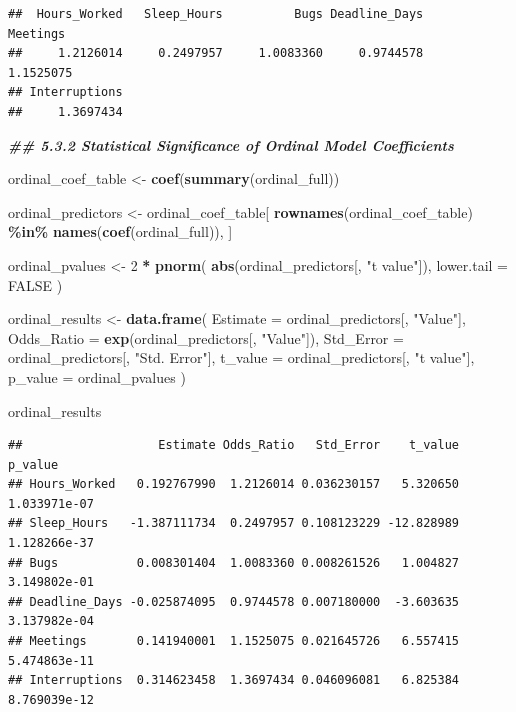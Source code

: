 \documentclass[
]{article}
\newenvironment{Shaded}{\begin{snugshade}}{\end{snugshade}}
\newcommand{\AttributeTok}[1]{\textcolor[rgb]{0.13,0.29,0.53}{#1}}
\newcommand{\ConstantTok}[1]{\textcolor[rgb]{0.56,0.35,0.01}{#1}}
\newcommand{\DecValTok}[1]{\textcolor[rgb]{0.00,0.00,0.81}{#1}}
\newcommand{\DocumentationTok}[1]{\textcolor[rgb]{0.56,0.35,0.01}{\textbf{\textit{#1}}}}
\newcommand{\FunctionTok}[1]{\textcolor[rgb]{0.13,0.29,0.53}{\textbf{#1}}}
\newcommand{\NormalTok}[1]{#1}
\newcommand{\OtherTok}[1]{\textcolor[rgb]{0.56,0.35,0.01}{#1}}
\newcommand{\SpecialCharTok}[1]{\textcolor[rgb]{0.81,0.36,0.00}{\textbf{#1}}}
\newcommand{\StringTok}[1]{\textcolor[rgb]{0.31,0.60,0.02}{#1}}
\begin{document}
\begin{verbatim}
##  Hours_Worked   Sleep_Hours          Bugs Deadline_Days      Meetings 
##     1.2126014     0.2497957     1.0083360     0.9744578     1.1525075 
## Interruptions 
##     1.3697434
\end{verbatim}

\begin{Shaded}
\begin{Highlighting}[]
\DocumentationTok{\#\# 5.3.2 Statistical Significance of Ordinal Model Coefficients}

\NormalTok{ordinal\_coef\_table }\OtherTok{\textless{}{-}} \FunctionTok{coef}\NormalTok{(}\FunctionTok{summary}\NormalTok{(ordinal\_full))}

\NormalTok{ordinal\_predictors }\OtherTok{\textless{}{-}}\NormalTok{ ordinal\_coef\_table[}
  \FunctionTok{rownames}\NormalTok{(ordinal\_coef\_table) }\SpecialCharTok{\%in\%} \FunctionTok{names}\NormalTok{(}\FunctionTok{coef}\NormalTok{(ordinal\_full)),}
\NormalTok{  ]}

\NormalTok{ordinal\_pvalues }\OtherTok{\textless{}{-}} \DecValTok{2} \SpecialCharTok{*} \FunctionTok{pnorm}\NormalTok{(}
  \FunctionTok{abs}\NormalTok{(ordinal\_predictors[, }\StringTok{"t value"}\NormalTok{]),}
  \AttributeTok{lower.tail =} \ConstantTok{FALSE}
\NormalTok{)}

\NormalTok{ordinal\_results }\OtherTok{\textless{}{-}} \FunctionTok{data.frame}\NormalTok{(}
  \AttributeTok{Estimate =}\NormalTok{ ordinal\_predictors[, }\StringTok{"Value"}\NormalTok{],}
  \AttributeTok{Odds\_Ratio =} \FunctionTok{exp}\NormalTok{(ordinal\_predictors[, }\StringTok{"Value"}\NormalTok{]),}
  \AttributeTok{Std\_Error =}\NormalTok{ ordinal\_predictors[, }\StringTok{"Std. Error"}\NormalTok{],}
  \AttributeTok{t\_value =}\NormalTok{ ordinal\_predictors[, }\StringTok{"t value"}\NormalTok{],}
  \AttributeTok{p\_value =}\NormalTok{ ordinal\_pvalues}
\NormalTok{)}

\NormalTok{ordinal\_results}
\end{Highlighting}
\end{Shaded}

\begin{verbatim}
##                   Estimate Odds_Ratio   Std_Error    t_value      p_value
## Hours_Worked   0.192767990  1.2126014 0.036230157   5.320650 1.033971e-07
## Sleep_Hours   -1.387111734  0.2497957 0.108123229 -12.828989 1.128266e-37
## Bugs           0.008301404  1.0083360 0.008261526   1.004827 3.149802e-01
## Deadline_Days -0.025874095  0.9744578 0.007180000  -3.603635 3.137982e-04
## Meetings       0.141940001  1.1525075 0.021645726   6.557415 5.474863e-11
## Interruptions  0.314623458  1.3697434 0.046096081   6.825384 8.769039e-12
\end{verbatim}
\end{document}

